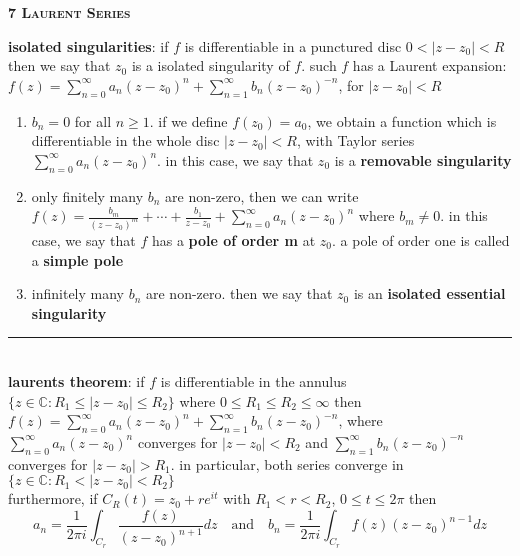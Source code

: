 \documentclass[a4paper]{article}
\newcommand*\abs[1]{\vert #1 \vert}
\newcommand*\linesep[0]{\noindent\rule{\textwidth}{0.5pt}\\}
\begin{document}
\begin{framed}
	\begin{center}
		\textbf{\textsc{7 Laurent Series}}
	\end{center}
	\textbf{isolated singularities}: if $f$ is differentiable in a punctured disc $0 < \abs{z - z_0} < R$ then we say that $z_0$ is a isolated singularity of $f$. such $f$ has a Laurent expansion: $f(z) = \sum_{n = 0}^\infty a_n(z - z_0)^n + \sum_{n = 1}^\infty b_n(z - z_0)^{-n}$, for $\abs{z - z_0} < R$
	
	\begin{enumerate}
		\item $b_n = 0$ for all $n \geq 1$. if we define $f(z_0) = a_0$, we obtain a function which is differentiable in the whole disc $\abs{z - z_0} < R$, with Taylor series $\sum_{n = 0}^\infty a_n (z - z_0)^n$. in this case, we say that $z_0$ is a \textbf{removable singularity}
		\item only finitely many $b_n$ are non-zero, then we can write $f(z) = \frac{b_m}{(z - z_0)^m} + \cdots + \frac{b_1}{z - z_0} + \sum_{n=0}^\infty a_n (z - z_0)^n$ where $b_m \neq 0$. in this case, we say that $f$ has a \textbf{pole of order m} at $z_0$. a pole of order one is called a \textbf{simple pole}
		\item infinitely many $b_n$ are non-zero. then we say that $z_0$ is an \textbf{isolated essential singularity}
	\end{enumerate}
	
	\linesep
	
	\noindent
	\textbf{laurents theorem}: if $f$ is differentiable in the annulus $\{ z \in \mathbb{C} : R_1 \leq \abs{z - z_0} \leq R_2 \}$ where $0 \leq R_1 \leq R_2 \leq \infty$ then $f(z) = \sum_{n=0}^\infty a_n(z - z_0)^n + \sum_{n=1}^\infty b_n(z - z_0)^{-n}$, where $\sum_{n=0}^\infty a_n(z - z_0)^n$ converges for $\abs{z - z_0} < R_2$ and $\sum_{n=1}^\infty b_n(z - z_0)^{-n}$ converges for $\abs{z - z_0} > R_1$. in particular, both series converge in $\{ z \in \mathbb{C} : R_1 < \abs{z - z_0} < R_2 \}$\\
	
	\noindent
	furthermore, if $C_R(t) = z_0 + re^{it}$ with $R_1 < r < R_2$, $0 \leq t \leq 2\pi$ then $$a_n = \frac{1}{2\pi i} \int_{C_r} \frac{f(z)}{(z - z_0)^{n + 1}} dz \quad \text{and} \quad b_n = \frac{1}{2\pi i} \int_{C_r} f(z)(z - z_0)^{n - 1} dz$$
\end{framed}
\end{document}
